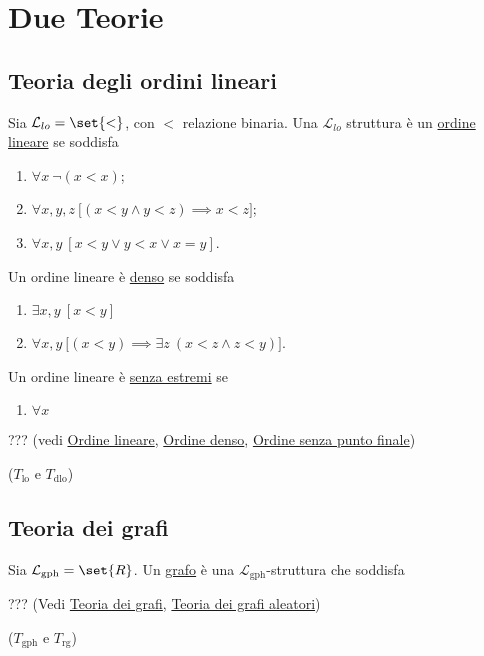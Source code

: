 \documentclass[10pt]{article}
\newcommand{\1}{\mathds{1}}
\theoremstyle{definition}%
\theoremstyle{plain}
\theoremstyle{remark}
\newcommand{\Tdlo}{T_{\text{dlo}}}
\newcommand{\Tlo}{T_{\text{lo}}}
\newcommand{\Trg}{T_{\text{rg}}}
\newcommand{\Tgph}{T_{\text{gph}}}
\begin{document}
\section{Due Teorie}
\label{sec:orgafae316}

\subsection{Teoria degli ordini lineari}
\label{sec:orgd66415c}

Sia \(\mathcal{L}_{lo}=\set{<}\), con \(<\) relazione binaria. Una \(\mathcal{L}_{lo}\) struttura è un \uline{ordine lineare} se soddisfa
\begin{enumerate}
\item \(\forall x\ \lnot(x<x)\);
\item \(\forall x,y,z\ \big[(x<y \land y<z)\implies x<z\big]\);
\item \(\forall x,y\ [x<y \lor y<x \lor x=y]\).
\end{enumerate}
Un ordine lineare è \uline{denso} se soddisfa
\begin{enumerate}
\item \(\exists x,y\ [x<y]\)
\item \(\forall x,y\ \big[(x<y)\implies \exists z\ (x<z \land z<y)\big]\).
\end{enumerate}
Un ordine lineare è \uline{senza estremi} se
\begin{enumerate}
\item \(\forall x\)
\end{enumerate}

??? (vedi \href{../../../../org/roam/20250203101604-ordine.org}{Ordine lineare}, \href{../../../../org/roam/20250203101604-ordine.org}{Ordine denso}, \href{../../../../org/roam/20250203101604-ordine.org}{Ordine senza punto finale})

(\(\Tlo\) e \(\Tdlo\))
\subsection{Teoria dei grafi}
\label{sec:org9a1b66a}

Sia \(\mathcal{L}_{\text{gph}} = \set{R}\). Un \uline{grafo} è una \(\mathcal{L}_{\text{gph}}\)-struttura che soddisfa

??? (Vedi \href{../../../../org/roam/20250213123032-teoria_dei_grafi.org}{Teoria dei grafi}, \href{../../../../org/roam/20250213123032-teoria_dei_grafi.org}{Teoria dei grafi aleatori})

(\(\Tgph\) e \(\Trg\))
\end{document}
